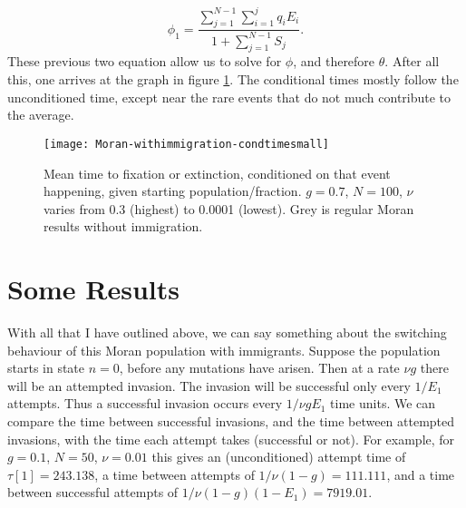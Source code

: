 \begin{equation}
\phi_1 = \frac{\sum_{j=1}^{N-1}\sum_{i=1}^{j}q_iE_i}{1+\sum_{j=1}^{N-1}S_j}. 
\end{equation}
These previous two equation allow us to solve for $\phi$, and therefore $\theta$. 
After all this, one arrives at the graph in figure \ref{condextntimefig}. 
The conditional times mostly follow the unconditioned time, except near the rare events that do not much contribute to the average. 
\begin{figure}[ht]
	\centering
	\texttt{[image: Moran-withimmigration-condtimesmall]}
	\caption{Mean time to fixation or extinction, conditioned on that event happening, given starting population/fraction. $g=0.7$, $N=100$, $\nu$ varies from 0.3 (highest) to 0.0001 (lowest). Grey is regular Moran results without immigration. } \label{condextntimefig}
\end{figure}%

\section{Some Results}%


With all that I have outlined above, we can say something about the switching behaviour of this Moran population with immigrants. 
Suppose the population starts in state $n=0$, before any mutations have arisen.  
Then at a rate $\nu g$ there will be an attempted invasion.  
The invasion will be successful only every $1/E_1$ attempts.  
Thus a successful invasion occurs every $1/\nu g E_1$ time units.  
We can compare the time between successful invasions, and the time between attempted invasions, with the time each attempt takes (successful or not). 
For example, for $g=0.1$, $N=50$, $\nu=0.01$ this gives an (unconditioned) attempt time of $\tau[1] = 243.138$, a time between attempts of $1/\nu(1-g) = 111.111$, and a time between successful attempts of $1/\nu(1-g)(1-E_1) = 7919.01$. 

